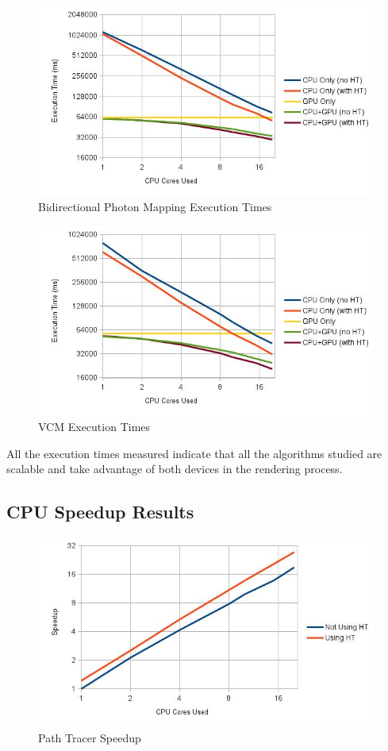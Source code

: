 \begin{figure}[H]
\includegraphics[width=\linewidth]{img/bpmTexec.jpg}
\caption{\label{img:bpmTexec} Bidirectional Photon Mapping Execution Times}
\end{figure}

\begin{figure}[H]
\includegraphics[width=\linewidth]{img/vcmTexec.jpg}
\caption{\label{img:vcmTexec} VCM Execution Times}
\end{figure}

All the execution times measured indicate that all the algorithms studied are scalable and take advantage of both devices in the rendering process.

\subsection{CPU Speedup Results}

\begin{figure}[H]
\includegraphics[width=\linewidth]{img/ptSpeedup.jpg}
\caption{\label{img:ptSpeedup} Path Tracer Speedup}
\end{figure}

